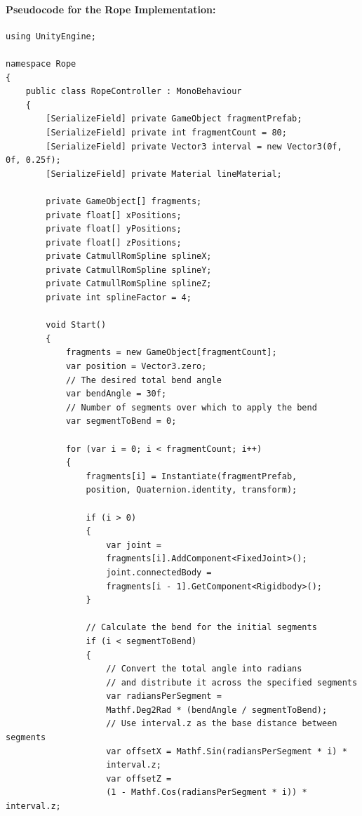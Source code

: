 \documentclass[12pt]{article}
\begin{document}
\begin{enumerate}
      \paragraph{Pseudocode for the Rope Implementation:}
      \begin{verbatim}
using UnityEngine;

namespace Rope
{
    public class RopeController : MonoBehaviour
    {
        [SerializeField] private GameObject fragmentPrefab;
        [SerializeField] private int fragmentCount = 80;
        [SerializeField] private Vector3 interval = new Vector3(0f, 0f, 0.25f);
        [SerializeField] private Material lineMaterial; 

        private GameObject[] fragments;
        private float[] xPositions;
        private float[] yPositions;
        private float[] zPositions;
        private CatmullRomSpline splineX;
        private CatmullRomSpline splineY;
        private CatmullRomSpline splineZ;
        private int splineFactor = 4;

        void Start()
        {
            fragments = new GameObject[fragmentCount];
            var position = Vector3.zero;
            // The desired total bend angle
            var bendAngle = 30f; 
            // Number of segments over which to apply the bend
            var segmentToBend = 0; 

            for (var i = 0; i < fragmentCount; i++)
            {
                fragments[i] = Instantiate(fragmentPrefab, 
                position, Quaternion.identity, transform);

                if (i > 0)
                {
                    var joint = 
                    fragments[i].AddComponent<FixedJoint>();
                    joint.connectedBody = 
                    fragments[i - 1].GetComponent<Rigidbody>();
                }

                // Calculate the bend for the initial segments
                if (i < segmentToBend)
                {
                    // Convert the total angle into radians 
                    // and distribute it across the specified segments
                    var radiansPerSegment = 
                    Mathf.Deg2Rad * (bendAngle / segmentToBend);
                    // Use interval.z as the base distance between segments
                    var offsetX = Mathf.Sin(radiansPerSegment * i) * 
                    interval.z; 
                    var offsetZ = 
                    (1 - Mathf.Cos(radiansPerSegment * i)) * interval.z;


\end{verbatim}
\end{enumerate}
\end{document}
